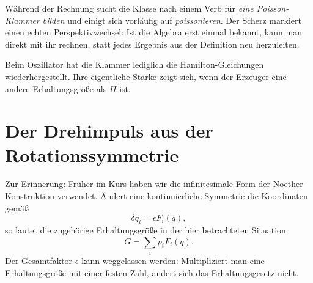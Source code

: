 Während der Rechnung sucht die Klasse nach einem Verb für \emph{eine Poisson-Klammer bilden} und einigt sich vorläufig auf \emph{poissonieren}. Der Scherz markiert einen echten Perspektivwechsel: Ist die Algebra erst einmal bekannt, kann man direkt mit ihr rechnen, statt jedes Ergebnis aus der Definition neu herzuleiten.

\begin{classroomqa}
\end{classroomqa}

\begin{classroomqa}
\end{classroomqa}

Beim Oszillator hat die Klammer lediglich die Hamilton-Gleichungen wiederhergestellt. Ihre eigentliche Stärke zeigt sich, wenn der Erzeuger eine andere Erhaltungsgröße als \(H\) ist.

\section{Der Drehimpuls aus der Rotationssymmetrie}

Zur Erinnerung: Früher im Kurs haben wir die infinitesimale Form der Noether-Konstruktion verwendet. Ändert eine kontinuierliche Symmetrie die Koordinaten gemäß
\begin{equation}
  \delta q_i=\epsilon F_i(q),
  \label{eq:l8-noether-variation}
\end{equation}
so lautet die zugehörige Erhaltungsgröße in der hier betrachteten Situation
\begin{equation}
  G=\sum_i p_iF_i(q).
  \label{eq:l8-noether-charge}
\end{equation}
Der Gesamtfaktor \(\epsilon\) kann weggelassen werden: Multipliziert man eine Erhaltungsgröße mit einer festen Zahl, ändert sich das Erhaltungsgesetz nicht.

